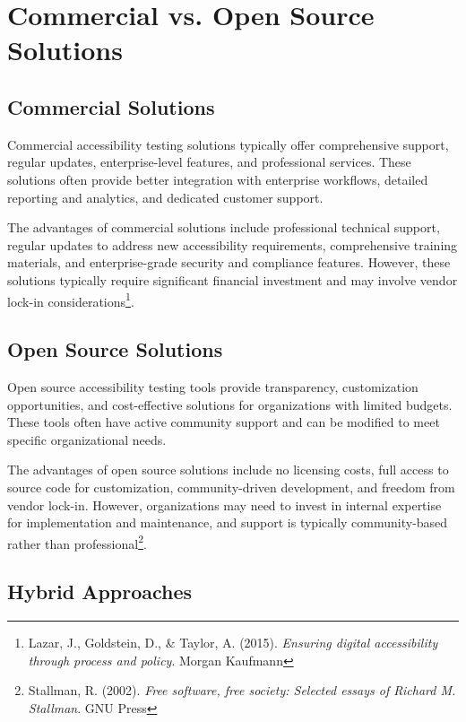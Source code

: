 \section{Commercial vs. Open Source Solutions}

\subsection{Commercial Solutions}

Commercial accessibility testing solutions typically offer comprehensive support, regular updates, enterprise-level features, and professional services. These solutions often provide better integration with enterprise workflows, detailed reporting and analytics, and dedicated customer support.

The advantages of commercial solutions include professional technical support, regular updates to address new accessibility requirements, comprehensive training materials, and enterprise-grade security and compliance features. However, these solutions typically require significant financial investment and may involve vendor lock-in considerations\footnote{Lazar, J., Goldstein, D., \& Taylor, A. (2015). \textit{Ensuring digital accessibility through process and policy}. Morgan Kaufmann}.

\subsection{Open Source Solutions}

Open source accessibility testing tools provide transparency, customization opportunities, and cost-effective solutions for organizations with limited budgets. These tools often have active community support and can be modified to meet specific organizational needs.

The advantages of open source solutions include no licensing costs, full access to source code for customization, community-driven development, and freedom from vendor lock-in. However, organizations may need to invest in internal expertise for implementation and maintenance, and support is typically community-based rather than professional\footnote{Stallman, R. (2002). \textit{Free software, free society: Selected essays of Richard M. Stallman}. GNU Press}.

\subsection{Hybrid Approaches}

